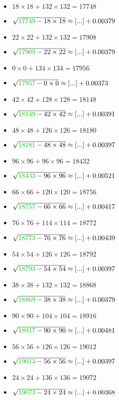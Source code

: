 \documentclass[12pt]{article}
\begin{document}
\begin{multicols}{2}
\begin{itemize}
\item $18\times18 + 132\times132 = 17748$
\item $\sqrt{ {\color{green!75!black}{17749}} - 18\times 18 } \approx [...] + 0.00379$
\item $22\times22 + 132\times132 = 17908$
\item $\sqrt{ {\color{green!75!black}{17909}} - 22\times 22 } \approx [...] + 0.00379$
\item $0\times0 + 134\times134 = 17956$
\item $\sqrt{ {\color{green!75!black}{17957}} - 0\times 0 } \approx [...] + 0.00373$
\item $42\times42 + 128\times128 = 18148$
\item $\sqrt{ {\color{green!75!black}{18149}} - 42\times 42 } \approx [...] + 0.00391$
\item $48\times48 + 126\times126 = 18180$
\item $\sqrt{ {\color{green!75!black}{18181}} - 48\times 48 } \approx [...] + 0.00397$
\item $96\times96 + 96\times96 = 18432$
\item $\sqrt{ {\color{green!75!black}{18433}} - 96\times 96 } \approx [...] + 0.00521$
\item $66\times66 + 120\times120 = 18756$
\item $\sqrt{ {\color{green!75!black}{18757}} - 66\times 66 } \approx [...] + 0.00417$
\item $76\times76 + 114\times114 = 18772$
\item $\sqrt{ {\color{green!75!black}{18773}} - 76\times 76 } \approx [...] + 0.00439$
\item $54\times54 + 126\times126 = 18792$
\item $\sqrt{ {\color{green!75!black}{18793}} - 54\times 54 } \approx [...] + 0.00397$
\item $38\times38 + 132\times132 = 18868$
\item $\sqrt{ {\color{green!75!black}{18869}} - 38\times 38 } \approx [...] + 0.00379$
\item $90\times90 + 104\times104 = 18916$
\item $\sqrt{ {\color{green!75!black}{18917}} - 90\times 90 } \approx [...] + 0.00481$
\item $56\times56 + 126\times126 = 19012$
\item $\sqrt{ {\color{green!75!black}{19013}} - 56\times 56 } \approx [...] + 0.00397$
\item $24\times24 + 136\times136 = 19072$
\item $\sqrt{ {\color{green!75!black}{19073}} - 24\times 24 } \approx [...] + 0.00368$

\end{itemize}
\end{multicols}
\end{document}
